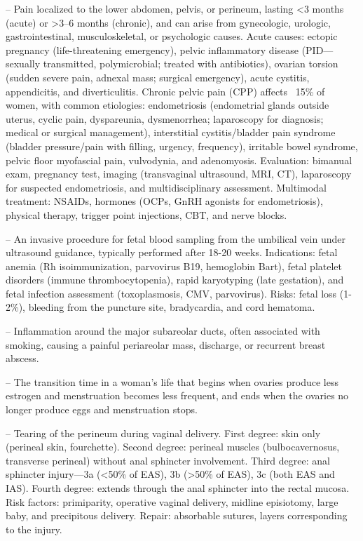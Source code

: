-- Pain localized to the lower abdomen, pelvis, or perineum, lasting <3 months (acute) or >3--6 months (chronic), and can arise from gynecologic, urologic, gastrointestinal, musculoskeletal, or psychologic causes. Acute causes: ectopic pregnancy (life-threatening emergency), pelvic inflammatory disease (PID—sexually transmitted, polymicrobial; treated with antibiotics), ovarian torsion (sudden severe pain, adnexal mass; surgical emergency), acute cystitis, appendicitis, and diverticulitis. Chronic pelvic pain (CPP) affects ~15\% of women, with common etiologies: endometriosis (endometrial glands outside uterus, cyclic pain, dyspareunia, dysmenorrhea; laparoscopy for diagnosis; medical or surgical management), interstitial cystitis/bladder pain syndrome (bladder pressure/pain with filling, urgency, frequency), irritable bowel syndrome, pelvic floor myofascial pain, vulvodynia, and adenomyosis. Evaluation: bimanual exam, pregnancy test, imaging (transvaginal ultrasound, MRI, CT), laparoscopy for suspected endometriosis, and multidisciplinary assessment. Multimodal treatment: NSAIDs, hormones (OCPs, GnRH agonists for endometriosis), physical therapy, trigger point injections, CBT, and nerve blocks.

-- An invasive procedure for fetal blood sampling from the umbilical vein under ultrasound guidance, typically performed after 18-20 weeks. Indications: fetal anemia (Rh isoimmunization, parvovirus B19, hemoglobin Bart), fetal platelet disorders (immune thrombocytopenia), rapid karyotyping (late gestation), and fetal infection assessment (toxoplasmosis, CMV, parvovirus). Risks: fetal loss (1-2\%), bleeding from the puncture site, bradycardia, and cord hematoma.

-- Inflammation around the major subareolar ducts, often associated with smoking, causing a painful periareolar mass, discharge, or recurrent breast abscess.

-- The transition time in a woman’s life that begins when ovaries produce less estrogen and menstruation becomes less frequent, and ends when the ovaries no longer produce eggs and menstruation stops.

-- Tearing of the perineum during vaginal delivery. First degree: skin only (perineal skin, fourchette). Second degree: perineal muscles (bulbocavernosus, transverse perineal) without anal sphincter involvement. Third degree: anal sphincter injury—3a (<50\% of EAS), 3b (>50\% of EAS), 3c (both EAS and IAS). Fourth degree: extends through the anal sphincter into the rectal mucosa. Risk factors: primiparity, operative vaginal delivery, midline episiotomy, large baby, and precipitous delivery. Repair: absorbable sutures, layers corresponding to the injury.

